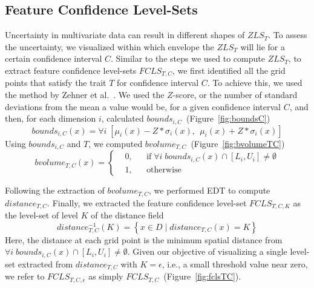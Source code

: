 \vspace{-2mm}
\subsection{Feature Confidence Level-Sets}
\label{sec:fcls}
%
Uncertainty in multivariate data can result in different shapes of $ZLS_{T}$.
%
To assess the uncertainty, we visualized within which envelope the $ZLS_{T}$ will lie for a certain confidence interval $C$.
%
Similar to the steps we used to compute $ZLS_{T}$, to extract feature confidence level-sets $FCLS_{T,C}$, we first identified all the grid points that satisfy the trait $T$ for confidence interval $C$.
%
To achieve this, we used the method by Zehner et al.~\cite{zehner2010visualization}. 
%
We used the $Z$-score, or the number of standard deviations from the mean a value would be, for a given confidence interval $C$, and then, for each dimension $i$, calculated $bounds_{i,C}$~(Figure~\ref{fig:boundsC})
\begin{equation}
bounds_{i,C}(x) = \forall i \; [{\mu}_{i}(x) - Z*{\sigma}_{i}(x),~~{\mu}_{i}(x) + Z*{\sigma}_{i}(x)]
\end{equation}
%
Using $bounds_{i,C}$ and $T$, we computed $bvolume_{T,C}$~(Figure~\ref{fig:bvolumeTC})
\begin{equation}
  bvolume_{T,C}(x) = \left \{
  \begin{aligned}
    &0, && \text{if}\; \forall i\; bounds_{i, C}(x) \cap [L_{i}, U_{i}] \neq \emptyset \\
    &1, && \text{otherwise}
  \end{aligned} \right.
\end{equation}
%

Following the extraction of $bvolume_{T,C}$, we performed EDT to compute $distance_{T,C}$.
%
Finally, we extracted the feature confidence level-set $FCLS_{T,C,K}$ as the level-set of level $K$ of the distance field
%
\begin{equation} 
distance_{T,C}^{-1}(K) = \left\{ x \in D\; |\; distance_{T,C}(x) = K\right\}
\end{equation}
Here, the distance at each grid point is the minimum spatial distance from $\forall i\; bounds_{i,C}(x) \cap [L_{i}, U_{i}] \neq \emptyset$.
%
Given our objective of visualizing a single level-set extracted from $distance_{T,C}$ with $K = \epsilon$, i.e., a small threshold value near zero, we refer to $FCLS_{T,C,\epsilon}$ as simply $FCLS_{T,C}$~(Figure~\ref{fig:fclsTC}).
%
